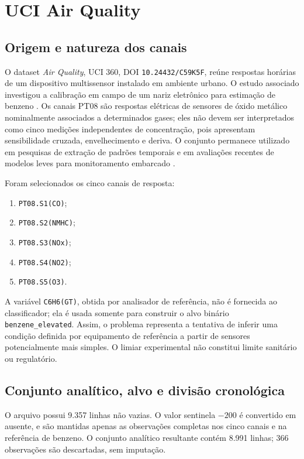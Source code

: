 \section{UCI Air Quality}

\subsection{Origem e natureza dos canais}

O dataset \textit{Air Quality}, UCI 360, DOI \texttt{10.24432/C59K5F}, reúne respostas horárias de um dispositivo multissensor instalado em ambiente urbano. O estudo associado investigou a calibração em campo de um nariz eletrônico para estimação de benzeno \cite{devito2008}. Os canais PT08 são respostas elétricas de sensores de óxido metálico nominalmente associados a determinados gases; eles não devem ser interpretados como cinco medições independentes de concentração, pois apresentam sensibilidade cruzada, envelhecimento e deriva. O conjunto permanece utilizado em pesquisas de extração de padrões temporais \cite{Jang2018} e em avaliações recentes de modelos leves para monitoramento embarcado \cite{Sami2025}.

Foram selecionados os cinco canais de resposta:

\begin{enumerate}[label=$X_{\arabic*}$:]
  \item \texttt{PT08.S1(CO)};
  \item \texttt{PT08.S2(NMHC)};
  \item \texttt{PT08.S3(NOx)};
  \item \texttt{PT08.S4(NO2)};
  \item \texttt{PT08.S5(O3)}.
\end{enumerate}

A variável \texttt{C6H6(GT)}, obtida por analisador de referência, não é fornecida ao classificador; ela é usada somente para construir o alvo binário \texttt{benzene\_elevated}. Assim, o problema representa a tentativa de inferir uma condição definida por equipamento de referência a partir de sensores potencialmente mais simples. O limiar experimental não constitui limite sanitário ou regulatório.

\subsection{Conjunto analítico, alvo e divisão cronológica}
\label{sec:air-quality-split}

O arquivo possui 9.357 linhas não vazias. O valor sentinela $-200$ é convertido em ausente, e são mantidas apenas as observações completas nos cinco canais e na referência de benzeno. O conjunto analítico resultante contém 8.991 linhas; 366 observações são descartadas, sem imputação.

